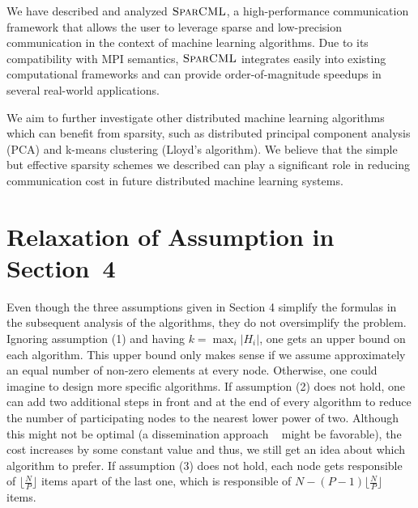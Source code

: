 \documentclass[11pt]{article}
\newcommand{\mml}{$\textsc{SparCML}$}
\begin{document}
We have described and analyzed \mml{}, a high-performance communication
framework that allows the user to leverage sparse and low-precision
communication in the context of machine learning algorithms.  Due to its
compatibility with MPI semantics, \mml{} integrates easily into
existing computational frameworks and can provide order-of-magnitude
speedups in several real-world applications. 
%

We aim to further investigate other distributed machine learning algorithms which can benefit from sparsity, such as distributed principal component analysis
(PCA) and k-means clustering (Lloyd's algorithm).
We believe that the simple but effective sparsity schemes we described can play a significant role in reducing communication cost in future
distributed machine learning systems. 


%




\appendix
\pagebreak

\section{Relaxation of Assumption in Section~4}

Even though the three assumptions given in Section 4 simplify the formulas in the subsequent analysis of the algorithms, they do not oversimplify the problem. Ignoring assumption (1) and having $k = \max_i \vert H_i \vert$, one gets an upper bound on each algorithm. This upper bound only makes sense if we assume approximately an equal number of non-zero elements at every node. Otherwise, one could imagine to design more specific algorithms. If assumption (2) does not hold, one can add two additional steps in front and at the end of every algorithm to reduce the number of participating nodes to the nearest lower power of two. Although this might not be optimal (a dissemination approach ~\cite{hensgen1988two} might be favorable), the cost increases by some constant value and thus, we still get an idea about which algorithm to prefer. If assumption (3) does not hold, each node gets responsible of $\lfloor \frac{N}{P} \rfloor$ items apart of the last one, which is responsible of $N - (P-1)\lfloor \frac{N}{P} \rfloor$ items.
\end{document}
